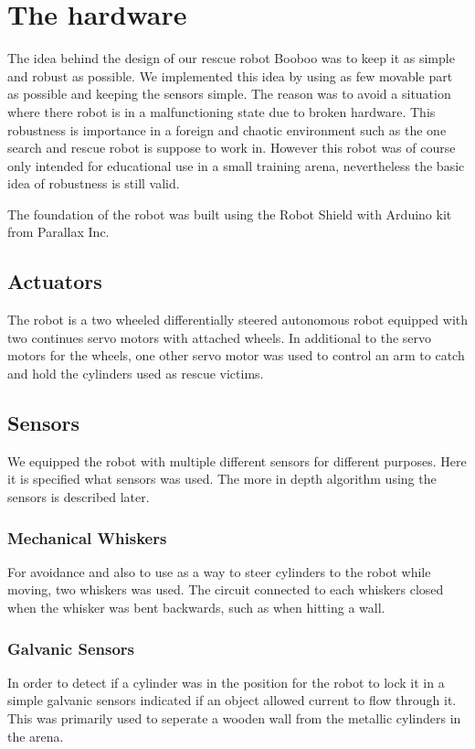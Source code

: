 \section{The hardware}
The idea behind the design of our rescue robot Booboo was to keep it as simple and robust as possible. We implemented this idea by using as few movable part as possible and keeping the sensors simple. The reason was to avoid a situation where there robot is in a malfunctioning state due to broken hardware. This robustness is importance in a foreign and chaotic environment such as the one search and rescue robot is suppose to work in. However this robot was of course only intended for educational use in a small training arena, nevertheless the basic idea of robustness is still valid. 

The foundation of the robot was built using the Robot Shield with Arduino kit from Parallax Inc. 

\subsection{Actuators}
The robot is a two wheeled differentially steered autonomous robot equipped with two continues servo motors with attached wheels. In additional to the servo motors for the wheels, one other servo motor was used to control an arm to catch and hold the cylinders used as rescue victims. 

\subsection{Sensors}
We equipped the robot with multiple different sensors for different purposes. Here it is specified what sensors was used. The more in depth algorithm using the sensors is described later.

\subsubsection{Mechanical Whiskers}
For avoidance and also to use as a way to steer cylinders to the robot while moving, two whiskers was used. The circuit connected to each whiskers closed when the whisker was bent backwards, such as when hitting a wall. 

\subsubsection{Galvanic Sensors}
In order to detect if a cylinder was in the position for the robot to lock it in a simple galvanic sensors indicated if an object allowed current to flow through it. This was primarily used to seperate a wooden wall from the metallic cylinders in the arena.

